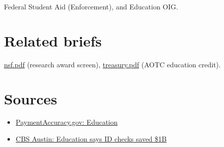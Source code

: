 \documentclass[letterpaper,11pt]{article}
\providecommand{\tightlist}{\setlength{\itemsep}{0pt}\setlength{\parskip}{0pt}}
\begin{document}
Federal Student Aid (Enforcement), and Education OIG.

\hypertarget{related-briefs}{%
\section{Related briefs}\label{related-briefs}}

\url{nsf.pdf} (research award screen), \url{treasury.pdf} (AOTC
education credit).

\hypertarget{sources}{%
\section{Sources}\label{sources}}

\begin{itemize}
\tightlist
\item
  \href{https://paymentaccuracy.gov/agency/ED}{PaymentAccuracy.gov:
  Education}
\item
  \href{https://cbsaustin.com/news/nation-world/education-dept-saves-taxpayers-1-billion-in-fraud-targets-federal-student-aid-programs-linda-mcmahon-california-gavin-newsom}{CBS
  Austin: Education says ID checks saved \$1B}
\end{itemize}
\end{document}
